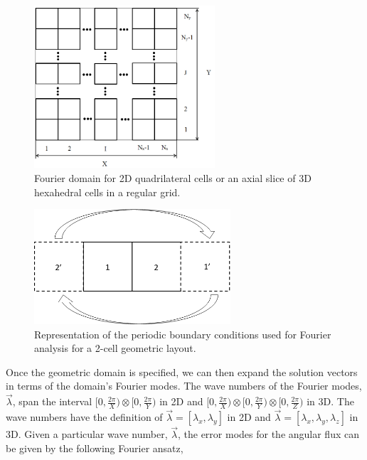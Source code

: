 \begin{figure}
\centering
\includegraphics[width=0.60\textwidth]{figures/sec_DSA/fourier_sq_layout.png}
\caption{Fourier domain for 2D quadrilateral cells or an axial slice of 3D hexahedral cells in a regular grid.}
\label{fig::DSA_fourier_grid_layout}
\end{figure}

\begin{figure}
\centering
\includegraphics[width=0.65\textwidth]{figures/sec_DSA/Fourier_periodic_BC.png}
\caption{Representation of the periodic boundary conditions used for Fourier analysis for a 2-cell geometric layout.}
\label{fig::DSA_fourier_periodic_BC}
\end{figure}

Once the geometric domain is specified, we can then expand the solution vectors in terms of the domain's Fourier modes. The wave numbers of the Fourier modes, $\vec{\lambda}$, span the interval $[0,\frac{2 \pi}{X}) \otimes [0,\frac{2 \pi}{Y})$ in 2D and $[0,\frac{2 \pi}{X}) \otimes [0,\frac{2 \pi}{Y})\otimes [0,\frac{2 \pi}{Z})$ in 3D. The wave numbers have the definition of $\vec{\lambda} = [\lambda_x, \lambda_y]$ in 2D and $\vec{\lambda} = [\lambda_x, \lambda_y, \lambda_z]$ in 3D. Given a particular wave number, $\vec{\lambda}$, the error modes for the angular flux can be given by the following Fourier ansatz,

